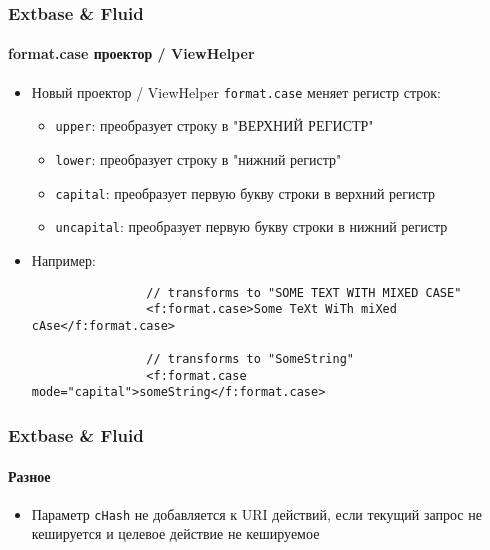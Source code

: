 
\begin{frame}[fragile]
	\frametitle{Extbase \& Fluid}
	\framesubtitle{format.case проектор / ViewHelper}

	\begin{itemize}

		\item Новый проектор / ViewHelper \texttt{format.case} меняет регистр строк:
			\begin{itemize}
				\item \texttt{upper}: преобразует строку в "ВЕРХНИЙ РЕГИСТР"
				\item \texttt{lower}: преобразует строку в "нижний регистр"
				\item \texttt{capital}: преобразует первую букву строки в верхний регистр
				\item \texttt{uncapital}: преобразует первую букву строки в нижний регистр
			\end{itemize}

		\item Например:

			\begin{lstlisting}
				// transforms to "SOME TEXT WITH MIXED CASE"
				<f:format.case>Some TeXt WiTh miXed cAse</f:format.case>

				// transforms to "SomeString"
				<f:format.case mode="capital">someString</f:format.case>
			\end{lstlisting}

	\end{itemize}

\end{frame}


\begin{frame}[fragile]
	\frametitle{Extbase \& Fluid}
	\framesubtitle{Разное}

	\begin{itemize}

		\item Параметр \texttt{cHash} не добавляется к URI действий, если текущий
			запрос не кешируется и целевое действие не кешируемое

	\end{itemize}

\end{frame}
